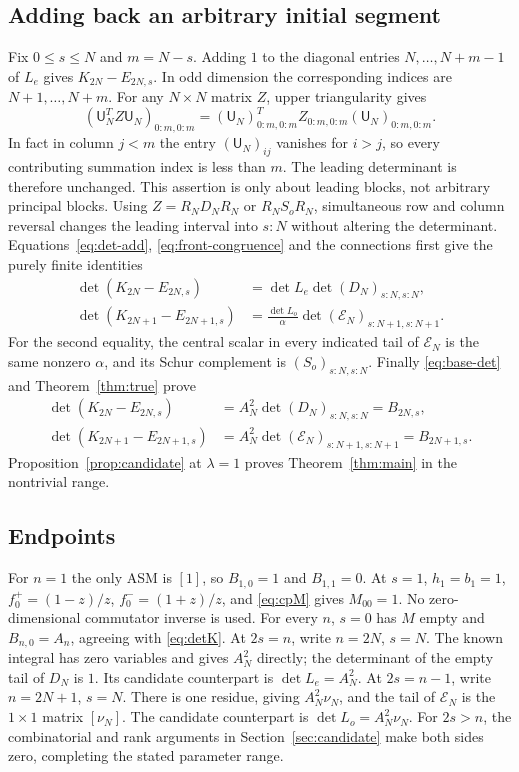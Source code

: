 \documentclass[11pt,a4paper]{amsart}
\theoremstyle{remark}\newtheorem{remark}[theorem]{Remark}
\numberwithin{equation}{section}
\newcommand{\U}{\mathsf U}
\newcommand{\EE}{\mathcal E}
\begin{document}
\subsection{Adding back an arbitrary initial segment}
Fix $0\le s\le N$ and $m=N-s$. Adding $1$ to the diagonal entries $N,\ldots,N+m-1$ of $L_e$ gives $K_{2N}-E_{2N,s}$. In odd dimension the corresponding indices are $N+1,\ldots,N+m$. For any $N\times N$ matrix $Z$, upper triangularity gives
\begin{equation}\label{eq:front-congruence}
 (\U_N^TZ\U_N)_{0:m,0:m}
 =(\U_N)_{0:m,0:m}^TZ_{0:m,0:m}(\U_N)_{0:m,0:m}.
\end{equation}
In fact in column $j<m$ the entry $(\U_N)_{ij}$ vanishes for $i>j$, so every contributing summation index is less than $m$. The leading determinant is therefore unchanged. This assertion is only about leading blocks, not arbitrary principal blocks.
Using $Z=R_ND_NR_N$ or $R_NS_oR_N$, simultaneous row and column reversal changes the leading interval into $s:N$ without altering the determinant. Equations~\eqref{eq:det-add}, \eqref{eq:front-congruence} and the connections first give the purely finite identities
\begin{equation}\label{eq:relative-bridges}
 \begin{split}
 \det(K_{2N}-E_{2N,s})&=\det L_e\det(D_N)_{s:N,s:N},\\
 \det(K_{2N+1}-E_{2N+1,s})&=\frac{\det L_o}{\alpha}
 \det(\EE_N)_{s:N+1,s:N+1}.
 \end{split}
\end{equation}
For the second equality, the central scalar in every indicated tail of $\EE_N$ is the same nonzero $\alpha$, and its Schur complement is $(S_o)_{s:N,s:N}$. Finally \eqref{eq:base-det} and Theorem~\ref{thm:true} prove
\begin{align}
 \det(K_{2N}-E_{2N,s})&=A_N^2\det(D_N)_{s:N,s:N}=B_{2N,s},\label{eq:even-final}\\
 \det(K_{2N+1}-E_{2N+1,s})&=A_N^2\det(\EE_N)_{s:N+1,s:N+1}=B_{2N+1,s}.\label{eq:odd-final}
\end{align}
Proposition~\ref{prop:candidate} at $\lambda=1$ proves Theorem~\ref{thm:main} in the nontrivial range.

\subsection{Endpoints}
For $n=1$ the only ASM is $[1]$, so $B_{1,0}=1$ and $B_{1,1}=0$. At $s=1$, $h_1=b_1=1$, $f_0^+=(1-z)/z$, $f_0^-=(1+z)/z$, and \eqref{eq:cpM} gives $M_{00}=1$. No zero-dimensional commutator inverse is used.
For every $n$, $s=0$ has $M$ empty and $B_{n,0}=A_n$, agreeing with \eqref{eq:detK}.
At $2s=n$, write $n=2N$, $s=N$. The known integral has zero variables and gives $A_N^2$ directly; the determinant of the empty tail of $D_N$ is $1$. Its candidate counterpart is $\det L_e=A_N^2$.
At $2s=n-1$, write $n=2N+1$, $s=N$. There is one residue, giving $A_N^2\nu_N$, and the tail of $\EE_N$ is the $1\times1$ matrix $[\nu_N]$. The candidate counterpart is $\det L_o=A_N^2\nu_N$.
For $2s>n$, the combinatorial and rank arguments in Section~\ref{sec:candidate} make both sides zero, completing the stated parameter range.
\end{document}
